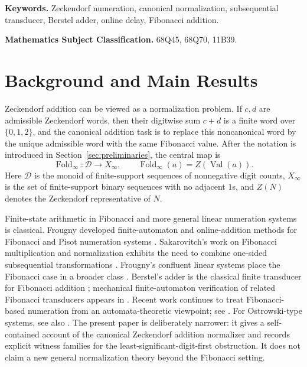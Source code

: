 \documentclass[11pt,letterpaper]{article}
\numberwithin{equation}{section}
\theoremstyle{plain}
\theoremstyle{definition}
\theoremstyle{remark}
\newcommand{\D}{\mathcal{D}}
\newcommand{\Xinf}{X_\infty}
\DeclareMathOperator{\Val}{Val}
\DeclareMathOperator{\Fold}{Fold}
\begin{document}
\medskip
\noindent\textbf{Keywords.}
Zeckendorf numeration, canonical normalization, subsequential transducer,
Berstel adder, online delay, Fibonacci addition.

\medskip
\noindent\textbf{Mathematics Subject Classification.}
68Q45, 68Q70, 11B39.

\section{Background and Main Results}

Zeckendorf addition can be viewed as a normalization problem.  If $c,d$ are
admissible Zeckendorf words, then their digitwise sum $c+d$ is a finite word
over $\{0,1,2\}$, and the canonical addition task is to replace this
noncanonical word by the unique admissible word with the same Fibonacci value.
After the notation is introduced in Section~\ref{sec:preliminaries}, the
central map is
\[
\Fold_\infty:\D\to \Xinf,\qquad \Fold_\infty(a)=Z(\Val(a)).
\]
Here $\D$ is the monoid of finite-support sequences of nonnegative digit
counts, $\Xinf$ is the set of finite-support binary sequences with no adjacent
$1$s, and $Z(N)$ denotes the Zeckendorf representative of $N$.

Finite-state arithmetic in Fibonacci and more general linear numeration
systems is classical.  Frougny developed finite-automaton and online-addition
methods for Fibonacci and Pisot numeration systems
\cite{Frougny1991FibonacciFiniteAutomata,Frougny1992NumbersAutomata,Frougny1999OnlineAddition}.
Sakarovitch's work on Fibonacci multiplication and normalization exhibits the
need to combine one-sided subsequential transformations
\cite{Sakarovitch1987EasyMultiplications}.  Frougny's confluent linear
systems place the Fibonacci case in a broader class
\cite{Frougny1992ConfluentLinearNumeration}.  Berstel's adder is the
classical finite transducer for Fibonacci addition
\cite{Berstel1986FibonacciWords,ITA_2001__35_6_491_0}; mechanical
finite-automaton verification of related Fibonacci transducers appears in
\cite{MousaviSchaefferShallit2016FibonacciAutomatic}.  Recent work continues
to treat Fibonacci-based numeration from an automata-theoretic viewpoint; see
\cite{AhlbachUsatineFrougnyPippenger2013,LabbeLepsova2023FibonacciTwosComplement}.
For Ostrowski-type systems, see also
\cite{HieronymiTerry2018OstrowskiAddition,BaranwalSchaefferShallit2021OstrowskiAutomatic}.
The present paper is deliberately narrower: it gives a self-contained account
of the canonical Zeckendorf addition normalizer and records explicit witness
families for the least-significant-digit-first obstruction.  It does not claim
a new general normalization theory beyond the Fibonacci setting.
\end{document}
